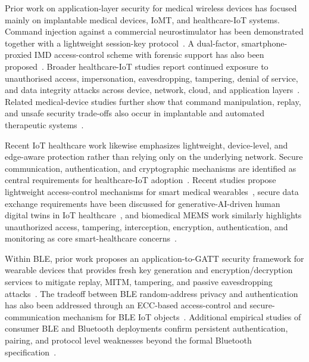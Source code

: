 \documentclass[journal]{IEEEtran}
\begin{document}
Prior work on application-layer security for medical wireless devices has focused mainly on implantable medical devices, IoMT, and healthcare-IoT systems.
Command injection against a commercial neurostimulator has been demonstrated together with a lightweight session-key protocol~\cite{marin2018neurostimulator}.
A dual-factor, smartphone-proxied IMD access-control scheme with forensic support has also been proposed~\cite{chi2018esafe}.
Broader healthcare-IoT studies report continued exposure to unauthorised access, impersonation, eavesdropping, tampering, denial of service, and data integrity attacks across device, network, cloud, and application layers~\cite{khatun2023hiotml,adil2024hciot,mrabet2020iotlayers}.
Related medical-device studies further show that command manipulation, replay, and unsafe security trade-offs also occur in implantable and automated therapeutic systems~\cite{zheng2017wannadie}.

Recent IoT healthcare work likewise emphasizes lightweight, device-level, and edge-aware protection rather than relying only on the underlying network.
Secure communication, authentication, and cryptographic mechanisms are identified as central requirements for healthcare-IoT adoption~\cite{adil2024hciot}.
Recent studies propose lightweight access-control mechanisms for smart medical wearables~\cite{irshad2024fasmw}, secure data exchange requirements have been discussed for generative-AI-driven human digital twins in IoT healthcare~\cite{chen2024hdt}, and biomedical MEMS work similarly highlights unauthorized access, tampering, interception, encryption, authentication, and monitoring as core smart-healthcare concerns~\cite{jaime2023biomems}.

Within BLE, prior work proposes an application-to-GATT security framework for wearable devices that provides fresh key generation and encryption/decryption services to mitigate replay, MITM, tampering, and passive eavesdropping attacks~\cite{zhang2019bleframework}.
The tradeoff between BLE random-address privacy and authentication has also been addressed through an ECC-based access-control and secure-communication mechanism for BLE IoT objects~\cite{cha2017bleiot}.
Additional empirical studies of consumer BLE and Bluetooth deployments confirm persistent authentication, pairing, and protocol level weaknesses beyond the formal Bluetooth specification~\cite{peker2022heartrate,sevier2019ble,hassan2018btsurvey}.
\end{document}
